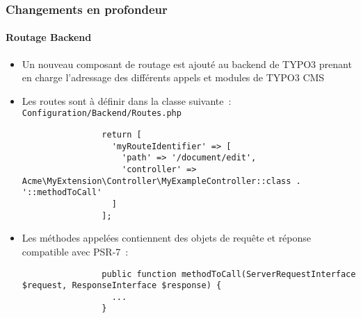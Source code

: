 \begin{frame}[fragile]
	\frametitle{Changements en profondeur}
	\framesubtitle{Routage Backend}

	\lstset{basicstyle=\tiny\ttfamily}

	\begin{itemize}

		\item Un nouveau composant de routage est ajouté au backend de TYPO3 prenant en
			charge l'adressage des différents appels et modules de TYPO3 CMS

		\item Les routes sont à définir dans la classe suivante~:\newline
			\small
				\texttt{Configuration/Backend/Routes.php}
			\normalsize

			\begin{lstlisting}
				return [
				  'myRouteIdentifier' => [
				    'path' => '/document/edit',
				    'controller' => Acme\MyExtension\Controller\MyExampleController::class . '::methodToCall'
				  ]
				];
			\end{lstlisting}

		\item Les méthodes appelées contiennent des objets de requête et réponse compatible avec PSR-7~:

			\begin{lstlisting}
				public function methodToCall(ServerRequestInterface $request, ResponseInterface $response) {
				  ...
				}
			\end{lstlisting}

	\end{itemize}

\end{frame}


